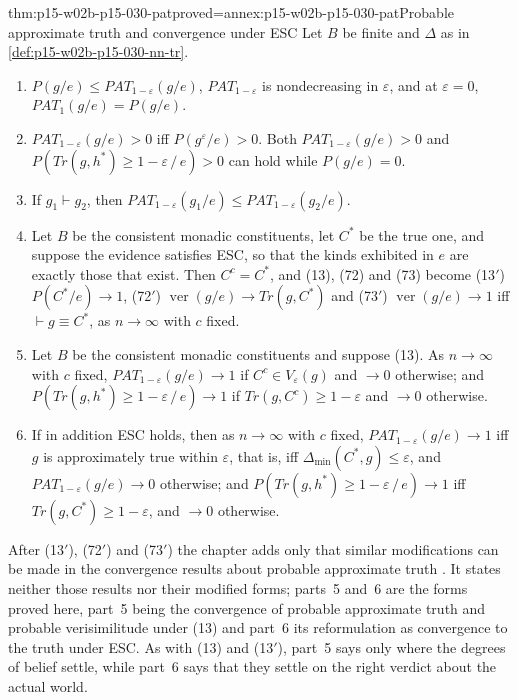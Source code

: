 \begin{hbtheorem}{thm:p15-w02b-p15-030-pat}{proved=annex:p15-w02b-p15-030-pat}{Probable approximate truth and convergence under ESC}
Let \(B\) be finite and \(\Delta\) as in \cref{def:p15-w02b-p15-030-nn-tr}.
\begin{enumerate}
\item \(P(g/e)\leq PAT_{1-\varepsilon}(g/e)\), \(PAT_{1-\varepsilon}\) is
  nondecreasing in \(\varepsilon\), and at \(\varepsilon=0\),
  \(PAT_1(g/e)=P(g/e)\).
\item \(PAT_{1-\varepsilon}(g/e)>0\) iff \(P(g^\varepsilon/e)>0\). Both
  \(PAT_{1-\varepsilon}(g/e)>0\) and \(P(Tr(g,h^*)\geq1-\varepsilon\,/\,e)>0\) can
  hold while \(P(g/e)=0\).
\item If \(g_1\vdash g_2\), then \(PAT_{1-\varepsilon}(g_1/e)\leq PAT_{1-\varepsilon}(g_2/e)\).
\item Let \(B\) be the consistent monadic constituents, let \(C^*\) be the
  true one, and suppose the evidence satisfies ESC, so that the kinds
  exhibited in \(e\) are exactly those that exist. Then \(C^c=C^*\), and (13),
  (72) and (73) become (13\('\)) \(P(C^*/e)\to1\), (72\('\))
  \(\operatorname{ver}(g/e)\to Tr(g,C^*)\) and (73\('\))
  \(\operatorname{ver}(g/e)\to1\) iff \(\vdash g\equiv C^*\), as \(n\to\infty\)
  with \(c\) fixed.
\item Let \(B\) be the consistent monadic constituents and suppose (13).
  As \(n\to\infty\) with \(c\) fixed, \(PAT_{1-\varepsilon}(g/e)\to1\) if
  \(C^c\in V_\varepsilon(g)\) and \(\to0\) otherwise; and
  \(P(Tr(g,h^*)\geq1-\varepsilon\,/\,e)\to1\) if \(Tr(g,C^c)\geq1-\varepsilon\) and
  \(\to0\) otherwise.
\item If in addition ESC holds, then as \(n\to\infty\) with \(c\) fixed,
  \(PAT_{1-\varepsilon}(g/e)\to1\) iff \(g\) is approximately true within
  \(\varepsilon\), that is, iff \(\Delta_{\min}(C^*,g)\leq\varepsilon\), and
  \(PAT_{1-\varepsilon}(g/e)\to0\) otherwise; and
  \(P(Tr(g,h^*)\geq1-\varepsilon\,/\,e)\to1\) iff \(Tr(g,C^*)\geq1-\varepsilon\),
  and \(\to0\) otherwise.
\end{enumerate}
\end{hbtheorem}

After (13\('\)), (72\('\)) and (73\('\)) the chapter adds only that similar
modifications can be made in the convergence results about probable
approximate truth \cite[p.~347]{Niiniluoto2011HintikkaProgramReading}. It
states neither those results nor their modified forms; parts~5 and~6 are
the forms proved here, part~5 being the convergence of probable
approximate truth and probable verisimilitude under (13) and part~6 its
reformulation as convergence to the truth under ESC. As with (13) and
(13\('\)), part~5 says only where the degrees of belief settle, while
part~6 says that they settle on the right verdict about the actual
world.


